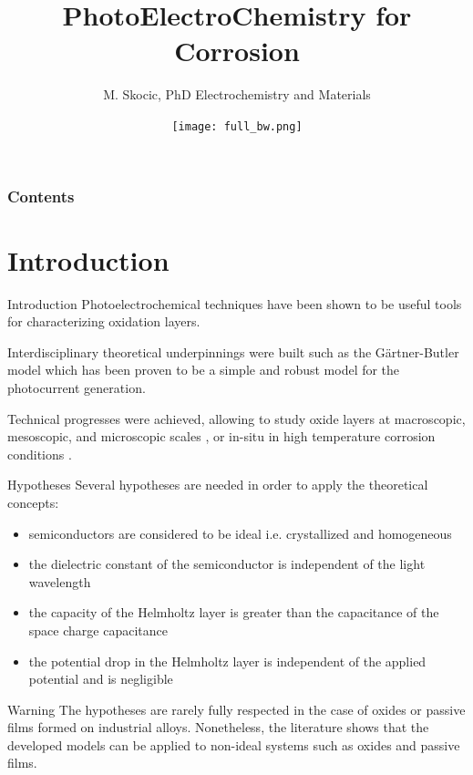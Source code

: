 \documentclass[10pt,compress]{beamer}
\title{PhotoElectroChemistry for Corrosion}
\author{M. Skocic, PhD Electrochemistry and Materials}
\date{\vfill \texttt{[image: full\_bw.png]}}
\begin{document}
    \begin{frame}
        \titlepage
    \end{frame}

    \begin{frame}
        \frametitle{Contents}
        \tableofcontents
    \end{frame}


\section{Introduction}
    \begin{frame}{Introduction}
        Photoelectrochemical techniques have been shown to be useful tools for characterizing oxidation layers. 
        
        Interdisciplinary theoretical underpinnings were built \citep{morrison1980, vijh1969, stimming1986, diquarto1997, wouters2007} 
        such as the Gärtner-Butler model \citep{gartner1959,butler1977}
        which has been proven to be a simple and robust model for the photocurrent generation. 
        
        Technical progresses were achieved, allowing to study oxide layers at 
        macroscopic, mesoscopic, and microscopic scales 
        \citep{benaboud2007, srisrual2011}, or in-situ in high temperature corrosion 
        conditions \citep{bojinov2002,skocic2016}.
    \end{frame}

    \begin{frame}{Hypotheses}
        Several hypotheses are needed in order to apply the theoretical concepts:  
        \begin{itemize}
            \item semiconductors are considered to be ideal i.e. crystallized and homogeneous  
            \item the dielectric constant of the semiconductor is independent of the light wavelength  
            \item the capacity of the Helmholtz layer is greater than the capacitance of the space charge capacitance  
            \item the potential drop in the Helmholtz layer is independent of the applied potential and is negligible
        \end{itemize}

        \footnotesize
        \begin{alertblock}{Warning}
            The hypotheses are rarely fully respected in the case of oxides or passive 
            films formed on industrial alloys. Nonetheless, the literature shows that the 
            developed models can be applied to non-ideal systems such as oxides 
            and passive films.
        \end{alertblock}
    \end{frame}
\end{document}
